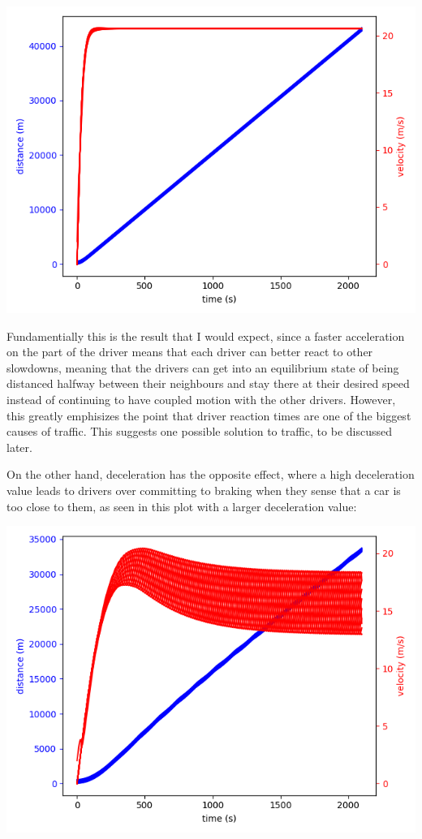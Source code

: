 \documentclass[11pt]{article}
\begin{document}
\begin{multicols}{2}
		\includegraphics[scale = 0.5]{Figure_3.png}

		\indent Fundamentially this is the result that I would expect, since a faster acceleration on the part of the driver means that each driver can better react to other slowdowns, meaning that the drivers can get into
		an equilibrium state of being distanced halfway between their neighbours and stay there at their desired speed instead of continuing to have coupled motion with the other drivers. However, this greatly emphisizes
		the point that driver reaction times are one of the biggest causes of traffic. This suggests one possible solution to traffic, to be discussed later.

		\indent On the other hand, deceleration has the opposite effect, where a high deceleration value leads to drivers over committing to braking when they sense that a car is too close to them, as seen in this plot with
		a larger deceleration value:

		\includegraphics[scale = 0.5]{Figure_4.png}


\end{multicols}
\end{document}

